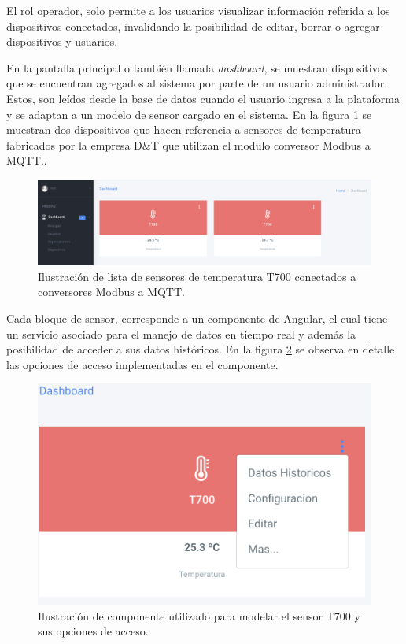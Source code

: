 El rol operador, solo permite a los usuarios visualizar información referida a los dispositivos conectados, invalidando la posibilidad de editar, borrar o agregar dispositivos y usuarios.

En la pantalla principal o también llamada \textit{dashboard}, se muestran dispositivos que se encuentran agregados al sistema por parte de un usuario administrador. Estos, son leídos desde la base de datos cuando el usuario ingresa a la plataforma y se adaptan a un modelo de sensor cargado en el sistema. En la figura \ref{fig:dashboard} se muestran dos dispositivos que hacen referencia a sensores de temperatura fabricados por la empresa D\&T que utilizan el modulo conversor Modbus a MQTT..  

 \begin{figure}[htpb]
	\centering
	\includegraphics[scale=.25]{./Figures/dashboard.png}
	\caption[Pantalla principal - \textit{dashboard}]{Ilustración de lista de sensores de temperatura T700 conectados a conversores Modbus a MQTT. }
	\label{fig:dashboard}
\end{figure}


Cada bloque de sensor, corresponde a un componente de Angular, el cual tiene un servicio asociado para el manejo de datos en tiempo real y además la posibilidad de acceder a sus datos históricos. En la figura \ref{fig:sensor-temp} se observa en detalle las opciones de acceso implementadas en el componente.

 \begin{figure}[htpb]
	\centering
	\includegraphics[scale=.40]{./Figures/sensor-temp.png}
	\caption[Sensor de temperatura T700]{Ilustración de componente utilizado para modelar el sensor T700 y sus opciones de acceso.}
	\label{fig:sensor-temp}
\end{figure}


